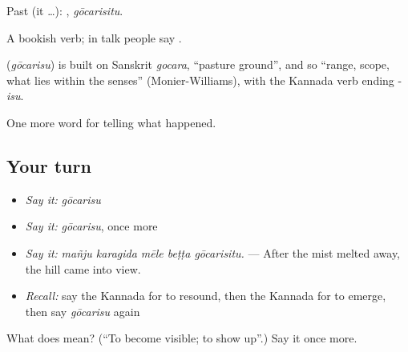Past (it …): , \emph{gōcarisitu}.

A bookish verb; in talk people say .

\begin{cousinweb}
\textbf{} (\emph{gōcarisu}) is built on Sanskrit \emph{gocara}, \textquotedblleft{}pasture ground\textquotedblright{}, and so \textquotedblleft{}range, scope, what lies within the senses\textquotedblright{} (Monier-Williams), with the Kannada verb ending -\emph{isu}.
\end{cousinweb}

\begin{grammarlens}[title={What you've built}]
One more word for telling what happened.
\end{grammarlens}

\subsection*{Your turn}
\begin{itemize}
\raggedright
  \item \emph{Say it:} \emph{gōcarisu}
  \item \emph{Say it:} \emph{gōcarisu}, once more
  \item \emph{Say it:} \emph{mañju karagida mēle beṭṭa gōcarisitu.} — After the mist melted away, the hill came into view.
  \item \emph{Recall:} say the Kannada for to resound, then the Kannada for to emerge, then say \emph{gōcarisu} again
\end{itemize}

\begin{tcolorbox}[breakable,colback=teal!4,colframe=teal!35!black,title={Before you move on}]
What does  mean? (\textquotedblleft{}To become visible; to show up\textquotedblright{}.) Say it once more.
\end{tcolorbox}
